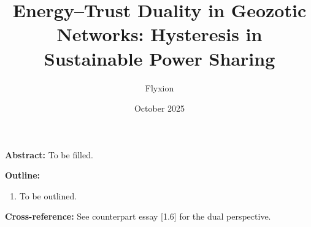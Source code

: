 \documentclass[12pt,a4paper]{article}
\title{Energy–Trust Duality in Geozotic Networks: Hysteresis in Sustainable Power Sharing}
\author{Flyxion}
\date{October 2025}
\begin{document}
\maketitle
\textbf{Abstract:} To be filled.

\bigskip
\textbf{Outline:}
\begin{enumerate}
\item To be outlined.
\end{enumerate}

\bigskip
\textbf{Cross-reference:} See counterpart essay [1.6] for the dual perspective.
\end{document}
